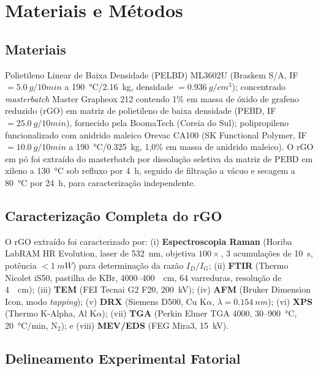 \documentclass[12pt,a4paper,twoside]{article}
\begin{document}
\section{Materiais e Métodos}

\subsection{Materiais}

Polietileno Linear de Baixa Densidade (PELBD) ML3602U (Braskem S/A, IF $= \SI{5,0}{g/10min}$ a \SI{190}{\celsius}/\SI{2,16}{kg}, densidade $= \SI{0,936}{g/cm^3}$); concentrado \textit{masterbatch} Master Grapheox 212 contendo 1\% em massa de óxido de grafeno reduzido (rGO) em matriz de polietileno de baixa densidade (PEBD, IF $= \SI{25,0}{g/10min}$), fornecido pela BoomaTech (Coreia do Sul); polipropileno funcionalizado com anidrido maleico Orevac CA100 (SK Functional Polymer, IF $= \SI{10,0}{g/10min}$ a \SI{190}{\celsius}/\SI{0,325}{kg}, 1,0\% em massa de anidrido maleico). O rGO em pó foi extraído do masterbatch por dissolução seletiva da matriz de PEBD em xileno a \SI{130}{\celsius} sob refluxo por \SI{4}{h}, seguido de filtração a vácuo e secagem a \SI{80}{\celsius} por \SI{24}{h}, para caracterização independente.

\subsection{Caracterização Completa do rGO}

O rGO extraído foi caracterizado por: (i) \textbf{Espectroscopia Raman} (Horiba LabRAM HR Evolution, laser de \SI{532}{nm}, objetiva $100\times$, 3 acumulações de \SI{10}{s}, potência $< \SI{1}{mW}$) para determinação da razão $I_D/I_G$; (ii) \textbf{FTIR} (Thermo Nicolet iS50, pastilha de KBr, 4000--\SI{400}{\per\cm}, 64 varreduras, resolução de \SI{4}{\per\cm}); (iii) \textbf{TEM} (FEI Tecnai G2 F20, \SI{200}{kV}); (iv) \textbf{AFM} (Bruker Dimension Icon, modo \textit{tapping}); (v) \textbf{DRX} (Siemens D500, Cu K$\alpha$, $\lambda = \SI{0,154}{nm}$); (vi) \textbf{XPS} (Thermo K-Alpha, Al K$\alpha$); (vii) \textbf{TGA} (Perkin Elmer TGA 4000, 30--\SI{900}{\celsius}, \SI{20}{\celsius/min}, N$_2$); e (viii) \textbf{MEV/EDS} (FEG Mira3, \SI{15}{kV}).

\subsection{Delineamento Experimental Fatorial}
\end{document}
